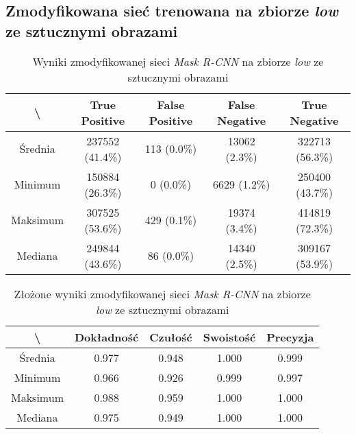 \subsection{Zmodyfikowana sieć trenowana na zbiorze \textit{low} ze sztucznymi obrazami}
\lowprocent

\begin{table}[H]
	\centering
	\caption{Wyniki zmodyfikowanej sieci \textit{Mask R-CNN} na zbiorze \textit{low} ze sztucznymi obrazami}
	\vspace{6pt}
	{\footnotesize
		\begin{tabular}{|c|c|c|c|c|}
      \hline \textbackslash & True Positive & False Positive & False Negative & True Negative \\
      \hline Średnia & 237552 (41.4\%) & 113 (0.0\%) & 13062 (2.3\%) & 322713 (56.3\%) \\
      \hline Minimum & 150884 (26.3\%) & 0 (0.0\%) & 6629 (1.2\%) & 250400 (43.7\%) \\
      \hline Maksimum & 307525 (53.6\%) & 429 (0.1\%) & 19374 (3.4\%) & 414819 (72.3\%) \\
      \hline Mediana & 249844 (43.6\%) & 86 (0.0\%) & 14340 (2.5\%) & 309167 (53.9\%) \\
      \hline
		\end{tabular}
	}
  \vspace{0pt}
  \label{Tab:low_modified_generated}
\end{table}


\begin{table}[H]
	\centering
	\caption{Złożone wyniki zmodyfikowanej sieci \textit{Mask R-CNN} na zbiorze \textit{low} ze sztucznymi obrazami}
	\vspace{6pt}
	{\footnotesize
		\begin{tabular}{|c|c|c|c|c|}
      \hline \textbackslash & Dokładność & Czułość & Swoistość & Precyzja \\
      \hline Średnia & 0.977 & 0.948 & 1.000 & 0.999 \\
      \hline Minimum & 0.966 & 0.926 & 0.999 & 0.997 \\
      \hline Maksimum & 0.988 & 0.959 & 1.000 & 1.000 \\
      \hline Mediana & 0.975 & 0.949 & 1.000 & 1.000 \\
      \hline
		\end{tabular}
	}
  \vspace{0pt}
  \label{Tab:low_modified_generated_calculated}
\end{table}


